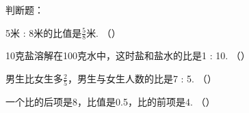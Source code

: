 判断题： \\

\begin{subquestions}

    \subquestion 5米 : 8米的比值是$\frac{5}{8}$米.  \hfill （\quad）

    \subquestion 10克盐溶解在100克水中，这时盐和盐水的比是1 : 10.   \hfill （\quad）

    \subquestion 男生比女生多$\frac{2}{5}$，男生与女生人数的比是7 : 5.   \hfill （\quad）

    \subquestion 一个比的后项是8，比值是0.5，比的前项是4.   \hfill （\quad）

\end{subquestions}





